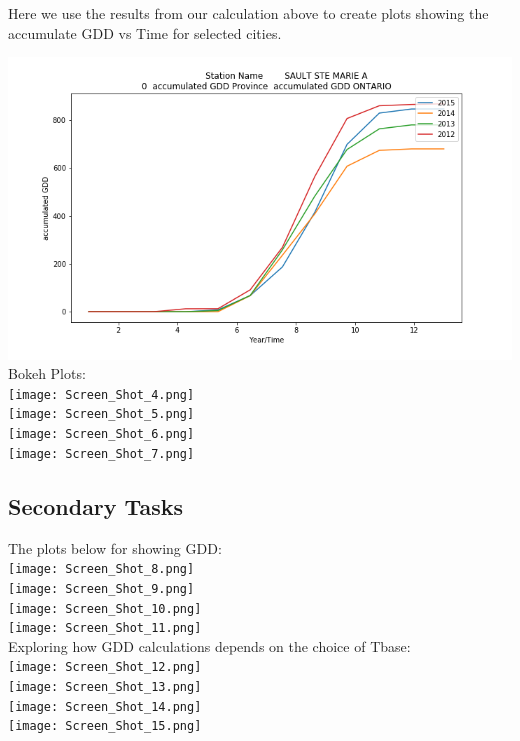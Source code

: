 Here we use the results from our calculation above to create plots showing the accumulate GDD vs Time for selected cities. 

\includegraphics[scale=0.35]{Fig_GDD_50092.png}\\

Bokeh Plots:\\

\texttt{[image: Screen\_Shot\_4.png]}\\
\texttt{[image: Screen\_Shot\_5.png]}\\
\texttt{[image: Screen\_Shot\_6.png]}\\
\texttt{[image: Screen\_Shot\_7.png]}\\
  

\subsection{Secondary Tasks}
The plots below for showing GDD:\\

\texttt{[image: Screen\_Shot\_8.png]}\\
\texttt{[image: Screen\_Shot\_9.png]}\\
\texttt{[image: Screen\_Shot\_10.png]}\\
\texttt{[image: Screen\_Shot\_11.png]}\\

Exploring how GDD calculations depends on the choice of Tbase:\\

\texttt{[image: Screen\_Shot\_12.png]}\\
\texttt{[image: Screen\_Shot\_13.png]}\\
\texttt{[image: Screen\_Shot\_14.png]}\\
\texttt{[image: Screen\_Shot\_15.png]}\\






